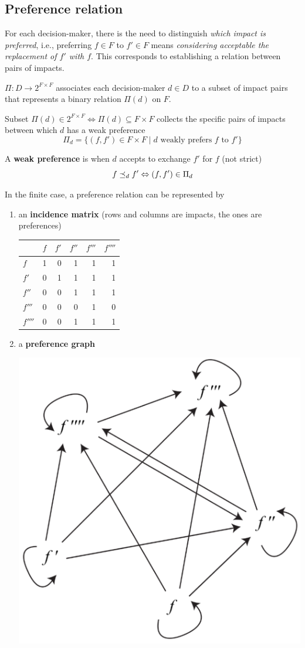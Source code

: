 \subsection{Preference relation}
\label{subsec:prefreltiondef}

For each decision-maker, there is the need to distinguish \textit{which impact is preferred}, i.e., preferring $f \in F$ to $f' \in F$ means \textit{considering acceptable the replacement of $f'$ with $f$}. This corresponds to establishing a relation between pairs of impacts.

$\Pi: D \rightarrow 2^{F \times F}$ associates each decision-maker $d \in D$ to a subset of impact pairs that represents a binary relation $\Pi (d)$ on $F$.

Subset $\Pi(d) \in 2^{F \times F} \Leftrightarrow \Pi(d) \subseteq F \times F$ collects the specific pairs of impacts between which $d$ has a weak preference
$$ \Pi_d = \{(f, f') \in F \times F \mid d \text{ weakly prefers } f \text{ to } f'\} $$

\begin{definition}
	A \textbf{weak preference} is when $d$ accepts to exchange $f'$ for $f$ (not strict)
	$$ f \preceq_{d} f' \Leftrightarrow (f, f') \in \Pi_d$$
\end{definition} 

In the finite case, a preference relation can be represented by
\begin{enumerate}
	\item an \textbf{incidence matrix} (rows and columns are impacts, the ones are preferences)
	\begin{center}
		\begin{tabular}{@{}l|rrrrr@{}}
			\toprule
			& $f$ & $f'$ & $f''$ & $f'''$ & $f''''$ \\
			\midrule
			$f$   & 1 &  0 & 1 & 1 & 1 \\
			$f'$  & 0 & 1 & 1 & 1 & 1 \\
			$f''$  & 0 &  0 & 1 &  1 & 1 \\
			$f'''$ & 0 &  0 & 0 & 1 & 0 \\
			$f''''$ & 0 & 0 & 1 & 1 & 1 \\
			\bottomrule
		\end{tabular}
	\end{center}
	
	\item a \textbf{preference graph}
	\begin{center}
		\includegraphics[width=0.45\columnwidth]{img/dp/fundamentaldefinitions/graph1}
	\end{center}
\end{enumerate}

